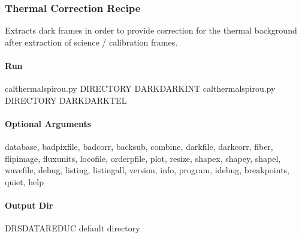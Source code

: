 \documentclass[a4paper,10pt,english]{report}
\begin{document}
\subsubsection{Thermal Correction Recipe}
\label{\detokenize{user/spirou/recipes/thermal:thermal-correction-recipe}}\label{\detokenize{user/spirou/recipes/thermal:recipes-spirou-thermal}}\label{\detokenize{user/spirou/recipes/thermal::doc}}
Extracts dark frames in order to provide correction for the thermal background
after extraction of science / calibration frames.


\paragraph{Run}
\label{\detokenize{user/spirou/recipes/thermal:run}}
\begin{sphinxVerbatim}[commandchars=\\\{\}]
cal\PYGZus{}thermal\PYGZus{}spirou.py \PYG{o}{[}DIRECTORY\PYG{o}{]} \PYG{o}{[}DARK\PYGZus{}DARK\PYGZus{}INT\PYG{o}{]}
cal\PYGZus{}thermal\PYGZus{}spirou.py \PYG{o}{[}DIRECTORY\PYG{o}{]} \PYG{o}{[}DARK\PYGZus{}DARK\PYGZus{}TEL\PYG{o}{]}
\end{sphinxVerbatim}


\paragraph{Optional Arguments}
\label{\detokenize{user/spirou/recipes/thermal:optional-arguments}}
\begin{sphinxVerbatim}[commandchars=\\\{\}]
\PYGZhy{}\PYGZhy{}database, \PYGZhy{}\PYGZhy{}badpixfile, \PYGZhy{}\PYGZhy{}badcorr, \PYGZhy{}\PYGZhy{}backsub, \PYGZhy{}\PYGZhy{}combine,
\PYGZhy{}\PYGZhy{}darkfile, \PYGZhy{}\PYGZhy{}darkcorr,  \PYGZhy{}\PYGZhy{}fiber, \PYGZhy{}\PYGZhy{}flipimage, \PYGZhy{}\PYGZhy{}fluxunits,
\PYGZhy{}\PYGZhy{}locofile, \PYGZhy{}\PYGZhy{}orderpfile, \PYGZhy{}\PYGZhy{}plot, \PYGZhy{}\PYGZhy{}resize,
\PYGZhy{}\PYGZhy{}shapex, \PYGZhy{}\PYGZhy{}shapey, \PYGZhy{}\PYGZhy{}shapel, \PYGZhy{}\PYGZhy{}wavefile,
\PYGZhy{}\PYGZhy{}debug, \PYGZhy{}\PYGZhy{}listing, \PYGZhy{}\PYGZhy{}listingall, \PYGZhy{}\PYGZhy{}version, \PYGZhy{}\PYGZhy{}info,
\PYGZhy{}\PYGZhy{}program, \PYGZhy{}\PYGZhy{}idebug, \PYGZhy{}\PYGZhy{}breakpoints, \PYGZhy{}\PYGZhy{}quiet, \PYGZhy{}\PYGZhy{}help
\end{sphinxVerbatim}


\paragraph{Output Dir}
\label{\detokenize{user/spirou/recipes/thermal:output-dir}}
\begin{sphinxVerbatim}[commandchars=\\\{\}]
DRS\PYGZus{}DATA\PYGZus{}REDUC    default  directory
\end{sphinxVerbatim}
\end{document}
